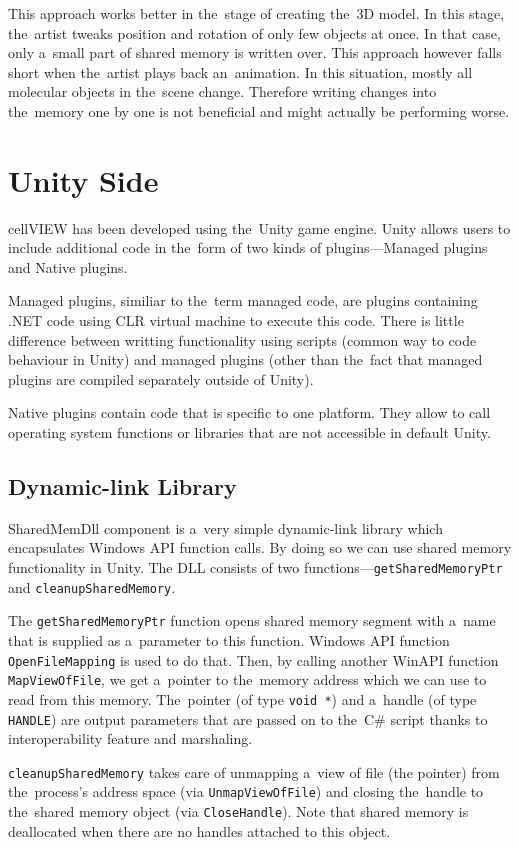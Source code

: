 \documentclass[
  digital, %
  table,   %
  nolof,     %
  nolot,     %
  oneside,
]{fithesis3}
\begin{document}
This approach works better in the stage of creating the 3D model. In this stage, the artist tweaks position and rotation of only few objects at once. In that case, only a small part of shared memory is written over. This approach however falls short when the artist plays back an animation. In this situation, mostly all molecular objects in the scene change. Therefore writing changes into the memory one by one is not beneficial and might actually be performing worse.

\section{Unity Side}
cellVIEW has been developed using the Unity game engine. Unity allows users to include additional code in the form of two kinds of plugins—Managed plugins and Native plugins.

Managed plugins, similiar to the term managed code, are plugins containing .NET code using CLR virtual machine to execute this code. There is little difference between writting functionality using scripts (common way to code behaviour in Unity) and managed plugins (other than the fact that managed plugins are compiled separately outside of Unity).

Native plugins contain code that is specific to one platform. They allow to call operating system functions or libraries that are not accessible in default Unity.

\subsection{Dynamic-link Library}
SharedMemDll component is a very simple dynamic-link library which encapsulates Windows API function calls. By doing so we can use shared memory functionality in Unity. The DLL consists of two functions—\texttt{get\-Shared\-Memory\-Ptr} and \texttt{cleanup\-Shared\-Memory}.

The \texttt{getSharedMemoryPtr} function opens shared memory segment with a name that is supplied as a parameter to this function. Windows API function \texttt{OpenFileMapping} is used to do that. Then, by calling another WinAPI function \texttt{MapViewOfFile}, we get a pointer to the memory address which we can use to read from this memory. The pointer (of type \texttt{void *}) and a handle (of type \texttt{HANDLE}) are output parameters that are passed on to the C\# script thanks to interoperability feature and marshaling.

\texttt{cleanupSharedMemory} takes care of unmapping a view of file (the pointer) from the process's address space (via \texttt{UnmapViewOfFile}) and closing the handle to the shared memory object (via \texttt{CloseHandle}). Note that shared memory is deallocated when there are no handles attached to this object.
\end{document}
